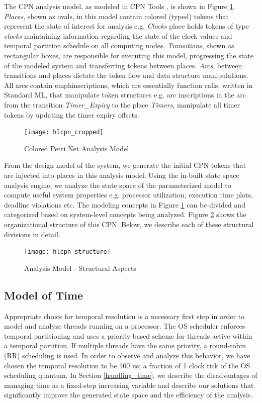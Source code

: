 The CPN analysis model, as modeled in CPN Tools \cite{CPNTools}, is shown in Figure \ref{fig:hlcpn}. \emph{Places}, shown as ovals, in this model contain colored (typed) tokens that represent the state of interest for analysis e.g. \emph{Clocks} place holds tokens of type \emph{clocks} maintaining information regarding the state of the clock values and temporal partition schedule on all computing nodes. \emph{Transitions}, shown as rectangular boxes, are responsible for executing this model, progressing the state of the modeled system and transferring tokens between places. \emph{Arcs}, between transitions and places dictate the token flow and data structure manipulations. All arcs contain emph{inscriptions}, which are essentially function calls, written in Standard ML, that manipulate token structures e.g. arc inscriptions in the arc from the transition \emph{Timer\_Expiry} to the place \emph{Timers}, manipulate all timer tokens by updating the timer expiry offsets. 

\begin{figure}[h]
	\centering
	\texttt{[image: hlcpn\_cropped]}
	\caption{Colored Petri Net Analysis Model}
	\label{fig:hlcpn}
\end{figure}

From the design model of the system, we generate the initial CPN tokens that are injected into places in this analysis model. Using the in-built state space analysis engine, we analyze the state space of the parameterized model to compute useful system properties e.g. processor utilization, execution time plots, deadline violations etc. The modeling concepts in Figure \ref{fig:hlcpn} can be divided and categorized based on system-level concepts being analyzed. Figure \ref{fig:hlcpn_structure} shows the organizational structure of this CPN. Below, we describe each of these structural divisions in detail. 

\begin{figure}[h]
	\centering
	\texttt{[image: hlcpn\_structure]}
	\caption{Analysis Model - Structural Aspects}
	\label{fig:hlcpn_structure}
\end{figure}

\subsection{Model of Time}
\label{sec:model_of_time}

Appropriate choice for temporal resolution is a necessary first step in order to model and analyze threads running on a processor. The OS scheduler enforces temporal partitioning and uses a priority-based scheme for threads active within a temporal partition. If multiple threads have the same priority, a round-robin (RR) scheduling is used. In order to observe and analyze this behavior, we have chosen the temporal resolution to be 100 us; a fraction of 1 clock tick of the OS scheduling quantum. In Section \ref{handling_time}, we describe the disadvantages of managing time as a fixed-step increasing variable and describe our solutions that significantly improve the generated state space and the efficiency of the analysis. 

